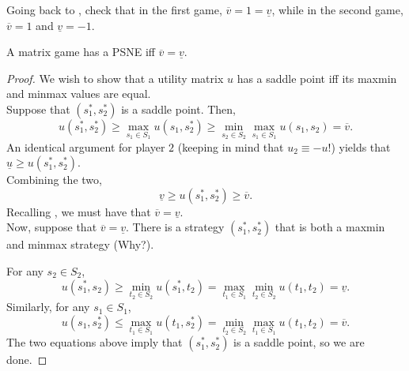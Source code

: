 	Going back to , check that in the first game, $\overline{v} = 1 = \underline{v}$, while in the second game, $\overline{v} = 1$ and $\underline{v} = -1$.

	\begin{ftheo}
		A matrix game has a PSNE iff $\overline{v} = \underline{v}$.
	\end{ftheo}
	\begin{proof}
		We wish to show that a utility matrix $u$ has a saddle point iff its maxmin and minmax values are equal.\\
		
		Suppose that $(s_1^*,s_2^*)$ is a saddle point. Then,
		\[ u(s_1^*,s_2^*) \ge \max_{s_1 \in S_1} u(s_1,s_2^*) \ge \min_{s_2 \in S_2} \max_{s_1 \in S_1} u(s_1,s_2) = \overline{v}. \]
		An identical argument for player $2$ (keeping in mind that $u_2 \equiv -u$!) yields that $\underline{u} \ge u(s_1^*,s_2^*)$.\\
		Combining the two,
		\[ \underline{v} \ge u(s_1^*,s_2^*) \ge \overline{v}. \]
		Recalling , we must have that $\overline{v} = \underline{v}$.\\

		Now, suppose that $\overline{v} = \underline{v}$. There is a strategy $(s_1^*,s_2^*)$ that is both a maxmin and minmax strategy (Why?).

		For any $s_2 \in S_2$,
		\[ u(s_1^*,s_2) \ge \min_{t_2 \in S_2} u(s_1^*,t_2) = \max_{t_1 \in S_1} \min_{t_2 \in S_2} u(t_1,t_2) = \underline{v}. \]
		Similarly, for any $s_1 \in S_1$,
		\[ u(s_1,s_2^*) \le \max_{t_1 \in S_1} u(t_1,s_2^*) = \min_{t_2 \in S_2} \max_{t_1 \in S_1} u(t_1,t_2) = \overline{v}. \]
		The two equations above imply that $(s_1^*,s_2^*)$ is a saddle point, so we are done.
	\end{proof}